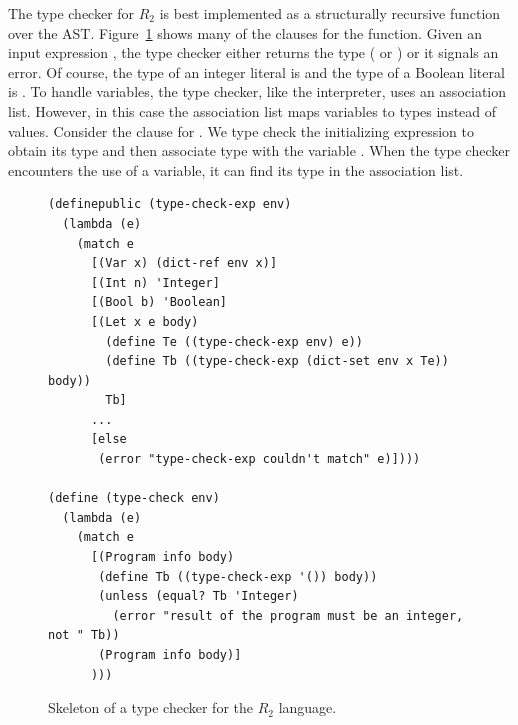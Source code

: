 \documentclass[11pt]{book}
\begin{document}
The type checker for $R_2$ is best implemented as a structurally
recursive function over the AST. Figure~\ref{fig:type-check-R2} shows
many of the clauses for the  function.  Given an
input expression , the type checker either returns the type
( or ) or it signals an error.  Of course,
the type of an integer literal is  and the type of a
Boolean literal is .  To handle variables, the type
checker, like the interpreter, uses an association list. However, in
this case the association list maps variables to types instead of
values. Consider the clause for .  We type check the
initializing expression to obtain its type  and then associate
type  with the variable . When the type checker
encounters the use of a variable, it can find its type in the
association list.

\begin{figure}[tbp]
\begin{lstlisting}
(definepublic (type-check-exp env)
  (lambda (e)
    (match e
      [(Var x) (dict-ref env x)]
      [(Int n) 'Integer]
      [(Bool b) 'Boolean]
      [(Let x e body)
        (define Te ((type-check-exp env) e))
        (define Tb ((type-check-exp (dict-set env x Te)) body))
        Tb]
      ...
      [else
       (error "type-check-exp couldn't match" e)])))

(define (type-check env)
  (lambda (e)
    (match e
      [(Program info body)
       (define Tb ((type-check-exp '()) body))
       (unless (equal? Tb 'Integer)
         (error "result of the program must be an integer, not " Tb))
       (Program info body)]
      )))
\end{lstlisting}
\caption{Skeleton of a type checker for the $R_2$ language.}
\label{fig:type-check-R2}
\end{figure}

\end{document}
